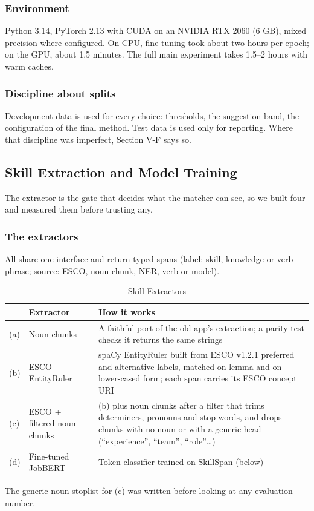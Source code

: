 \documentclass[conference,a4paper]{IEEEtran}
\begin{document}
\subsubsection{Environment} Python 3.14, PyTorch 2.13 with CUDA on an NVIDIA RTX 2060 (6 GB), mixed precision where configured. On CPU, fine-tuning took about two hours per epoch; on the GPU, about 1.5 minutes. The full main experiment takes 1.5–2 hours with warm caches.

\subsubsection{Discipline about splits} Development data is used for every choice: thresholds, the suggestion band, the configuration of the final method. Test data is used only for reporting. Where that discipline was imperfect, Section V-F says so.

\subsection{Skill Extraction and Model Training}
The extractor is the gate that decides what the matcher can see, so we built four and measured them before trusting any.

\subsubsection{The extractors} All share one interface and return typed spans (label: skill, knowledge or verb phrase; source: ESCO, noun chunk, NER, verb or model).

\begin{table}[!t]
\caption{Skill Extractors}
\label{tab:4}
\centering
\footnotesize
\begin{tabularx}{\textwidth}{l>{\raggedright\arraybackslash}X>{\raggedright\arraybackslash}X}
\hline
\textbf{} & \textbf{Extractor} & \textbf{How it works} \\
\hline
(a) & Noun chunks & A faithful port of the old app's extraction; a parity test checks it returns the same strings \\
(b) & ESCO EntityRuler & spaCy EntityRuler built from ESCO v1.2.1 preferred and alternative labels, matched on lemma and on lower-cased form; each span carries its ESCO concept URI \\
(c) & ESCO + filtered noun chunks & (b) plus noun chunks after a filter that trims determiners, pronouns and stop-words, and drops chunks with no noun or with a generic head (``experience'', ``team'', ``role''\ldots{}) \\
(d) & Fine-tuned JobBERT & Token classifier trained on SkillSpan (below) \\
\hline
\end{tabularx}
\end{table}
The generic-noun stoplist for (c) was written before looking at any evaluation number.
\end{document}
